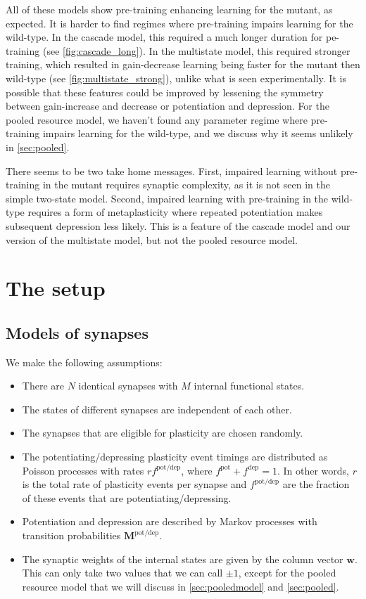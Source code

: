 \documentclass[12pt]{article}
\newcommand{\w}{\mathbf{w}}
\newcommand{\M}{\mathbf{M}}
\newcommand{\pot}{^{\text{pot}}}
\newcommand{\dep}{^{\text{dep}}}
\newcommand{\potdep}{^{\text{pot/dep}}}
\begin{document}
All of these models show pre-training enhancing learning for the mutant, as expected.
It is harder to find regimes where pre-training impairs learning for the wild-type.
In the cascade model, this required a much longer duration for pe-training (see \autoref{fig:cascade_long}).
In the multistate model, this required stronger training, which resulted in gain-decrease learning being faster for the mutant then wild-type (see \autoref{fig:multistate_strong}), unlike what is seen experimentally.
It is possible that these features could be improved by lessening the symmetry between gain-increase and decrease or potentiation and depression.
For the pooled resource model, we haven't found any parameter regime where pre-training impairs learning for the wild-type, and we discuss why it seems unlikely in \autoref{sec:pooled}.

There seems to be two take home messages.
First, impaired learning without pre-training in the mutant requires synaptic complexity, as it is not seen in the simple two-state model.
Second, impaired learning with pre-training in the wild-type requires a form of metaplasticity where repeated potentiation makes subsequent depression less likely.
This is a feature of the cascade model and our version of the multistate model, but not the pooled resource model.


\section{The setup}\label{sec:setup}


\subsection{Models of synapses}\label{sec:synapse}

We make the following assumptions:
\begin{itemize}
  \item There are $N$ identical synapses with $M$ internal functional states.
  \item The states of different synapses are independent of each other.
  \item The synapses that are eligible for plasticity are chosen randomly.
  \item The potentiating/depressing plasticity event timings are distributed as Poisson processes with rates $rf\potdep$, where $f\pot+f\dep=1$.
      In other words, $r$ is the total rate of plasticity events per synapse and $f\potdep$ are the fraction of these events that are potentiating/depressing.
  \item Potentiation and depression are described by Markov processes with transition probabilities $\M\potdep$.
  \item The synaptic weights of the internal states are given by the column vector $\w$. This can only take two values that we can call $\pm1$, except for the pooled resource model that we will discuss in \autoref{sec:pooledmodel} and \autoref{sec:pooled}.
\end{itemize}
\end{document}
